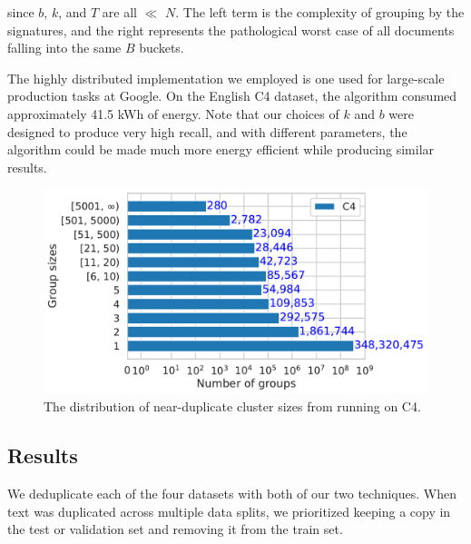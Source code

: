 \noindent since $b$, $k$, and $T$ are all $\ll$ $N$. The left term is the complexity of grouping by the signatures, and the right represents the pathological worst case of all documents falling into the same $B$ buckets.

The highly distributed \Approx{} implementation we employed is one used for large-scale production tasks at Google.
On the English C4 dataset, the algorithm consumed approximately 41.5 kWh of energy.
Note that our choices of $k$ and $b$ were designed to produce very high recall, and with different parameters, the algorithm could be made much more energy efficient while producing similar results.


\begin{figure}[t]
    \centering
    \includegraphics[width=0.6\linewidth]{figures/nd3/nd3-cluster-hist-c4.pdf}
    \caption{The distribution of near-duplicate cluster sizes from running \Approx{} on C4.}
    \label{fig:nd3-cluster-hist-c4}
\end{figure}

\subsection{Results}\label{sec:deduplication-results}
We deduplicate each of the four datasets with both of our two techniques.
When text was duplicated across multiple data splits, we prioritized keeping a copy in the test or validation set and removing it from the train set.
%





